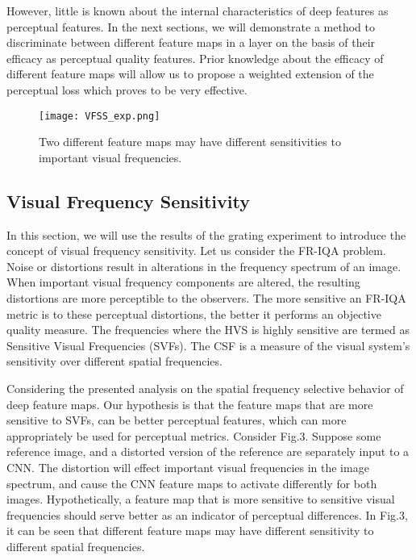 \documentclass[10pt,twocolumn,letterpaper]{article}
\begin{document}
However, little is known about the internal characteristics of deep features as perceptual features. In the next sections, we will demonstrate a method to discriminate between different feature maps in a layer on the basis of their efficacy as perceptual quality features. Prior knowledge  about the efficacy of different feature maps will allow us to propose a weighted extension of the perceptual loss which proves to be very effective.

\begin{figure}[t!]
\texttt{[image: VFSS\_exp.png]}
\caption{Two different feature maps may have different sensitivities to important visual frequencies.}
\label{fig:Spike_Sorting}
\end{figure}

\subsection{Visual Frequency Sensitivity}
In this section, we will use the results of the grating experiment to introduce the concept of visual frequency sensitivity. Let us consider the FR-IQA problem. Noise or distortions result in alterations in the frequency spectrum of an image. When important visual frequency components are altered, the resulting distortions are more perceptible to the observers. The more sensitive an FR-IQA metric is to these perceptual distortions, the better it performs an objective quality measure. The frequencies where the HVS is highly sensitive are termed as Sensitive Visual Frequencies (SVFs). The CSF is a measure of the visual system's sensitivity over different spatial frequencies.

    Considering the presented analysis on the spatial frequency selective behavior of deep feature maps. Our hypothesis is that the feature maps that are more sensitive to SVFs, can be better perceptual features, which can more appropriately be used for perceptual metrics. Consider Fig.3. Suppose some reference image, and a distorted version of the reference are separately input to a CNN. The distortion will effect important visual frequencies in the image spectrum, and cause the CNN feature maps to activate differently for both images. Hypothetically, a feature map that is more sensitive to sensitive visual frequencies should serve better as an indicator of perceptual differences. In Fig.3, it can be seen that different feature maps may have different sensitivity to different spatial frequencies.
    
\end{document}
